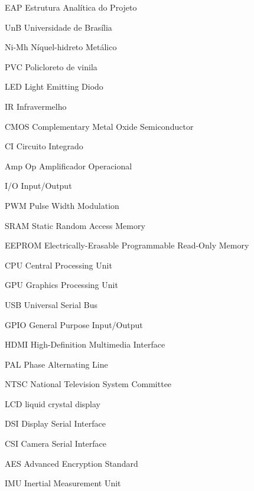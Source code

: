 \begin{siglas}
\item [EAP ] Estrutura Analítica do Projeto
\item [UnB ] Universidade de Brasília
\item [Ni-Mh ] Níquel-hidreto Metálico
\item [PVC ] Policloreto de vinila 
\item [LED ] Light Emitting Diodo
\item [IR ] Infravermelho
\item [CMOS ] Complementary Metal Oxide Semiconductor
\item [CI ] Circuito Integrado
\item [Amp Op ] Amplificador Operacional
\item [I/O ] Input/Output
\item [PWM ] Pulse Width Modulation
\item [SRAM ] Static Random Access Memory
\item [EEPROM ] Electrically-Erasable Programmable Read-Only Memory
\item [CPU ] Central Processing Unit
\item [GPU ] Graphics Processing Unit
\item [USB ] Universal Serial Bus
\item [GPIO ] General Purpose Input/Output
\item [HDMI ] High-Definition Multimedia Interface
\item [PAL ] Phase Alternating Line
\item [NTSC ] National Television System Committee
\item [LCD ] liquid crystal display
\item [DSI ] Display Serial Interface
\item [CSI ] Camera Serial Interface
\item [AES ] Advanced Encryption Standard
\item [IMU ] Inertial Measurement Unit
\end{siglas}
